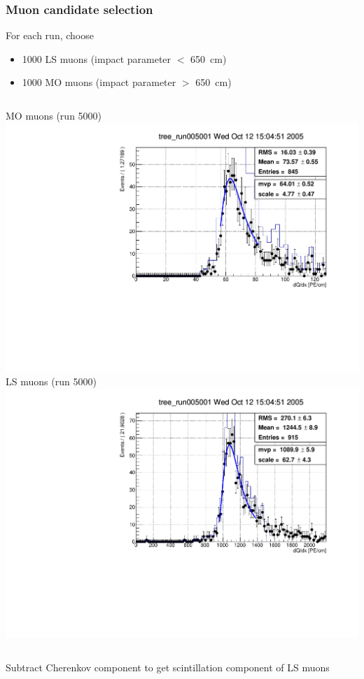 \documentclass{beamer}
\begin{document}
\begin{frame}
	\frametitle{Muon candidate selection}
	For each run, choose
	\begin{itemize}
		\item 1000 LS muons (impact parameter $<$ \SI{650}{\centi\meter})
		\item 1000 MO muons (impact parameter $>$ \SI{650}{\centi\meter})
	\end{itemize}
	\begin{columns}[t]
		MO muons (run 5000)
		\includegraphics[width=\textwidth]{tree_run005001_cherenID_dQdx.pdf}
		LS muons (run 5000)
		\includegraphics[width=\textwidth]{tree_run005001_scintID_dQdx.pdf}
	\end{columns}
	Subtract Cherenkov component to get scintillation component of LS muons
\end{frame}
\end{document}
